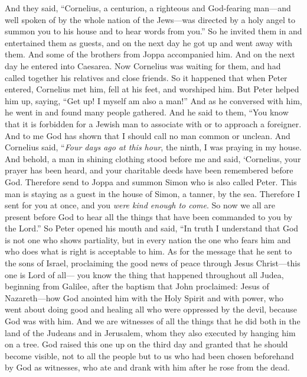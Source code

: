 \begin{biblechapter}
\verse And they said, “Cornelius, a centurion, a righteous and God-fearing man—and well spoken of by the whole nation of the Jews—was directed by a holy angel to summon you to his house and to hear words from you.”
\verse So he invited them in and entertained them as guests, and on the next day he got up and went away with them. And some of the brothers from Joppa accompanied him.
\verse And on the next day he entered into Caesarea.
 Now Cornelius was waiting for them, and had called together his relatives and close friends.
\verse So it happened that when Peter entered, Cornelius met him, fell at his feet, and worshiped him.
\verse But Peter helped him up, saying, “Get up! I myself am also a man!”
\verse And as he conversed with him, he went in and found many people gathered.
\verse And he said to them, “You know that it is forbidden for a Jewish man to associate with or to approach a foreigner. And to me God has shown that I should call no man common or unclean.
\verse And Cornelius said, “\textit{Four days ago at this hour}, the ninth, I was praying in my house. And behold, a man in shining clothing stood before me
\verse and said, ‘Cornelius, your prayer has been heard, and your charitable deeds have been remembered before God.
\verse Therefore send to Joppa and summon Simon who is also called Peter. This man is staying as a guest in the house of Simon, a tanner, by the sea.
\verse Therefore I sent for you at once, and you \textit{were kind enough to come}. So now we all are present before God to hear all the things that have been commanded to you by the Lord.”
\verse So Peter opened his mouth and said, “In truth I understand that God is not one who shows partiality,
\verse but in every nation the one who fears him and who does what is right is acceptable to him.
\verse As for the message that he sent to the sons of Israel, proclaiming the good news of peace through Jesus Christ—this one is Lord of all—
\verse you know the thing that happened throughout all Judea, beginning from Galilee, after the baptism that John proclaimed:
\verse Jesus of Nazareth—how God anointed him with the Holy Spirit and with power, who went about doing good and healing all who were oppressed by the devil, because God was with him.
\verse And we are witnesses of all the things that he did both in the land of the Judeans and in Jerusalem, whom they also executed by hanging him on a tree.
\verse God raised this one up on the third day and granted that he should become visible,
\verse not to all the people but to us who had been chosen beforehand by God as witnesses, who ate and drank with him after he rose from the dead.

\end{biblechapter}
